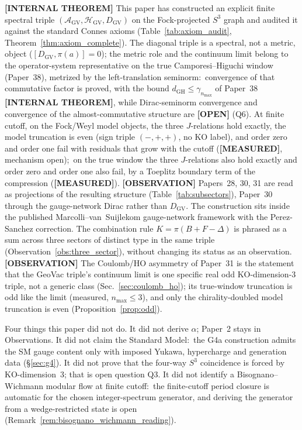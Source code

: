 \documentclass[11pt]{article}
\newcommand{\gvc}[2]{#2}
\begin{document}
\textbf{[INTERNAL THEOREM]} This paper has constructed an explicit finite spectral triple
$(\mathcal{A}_{\mathrm{GV}}, \mathcal{H}_{\mathrm{GV}},
D_{\mathrm{GV}})$ on the Fock-projected $S^3$ graph and audited it
against the standard Connes axioms (Table~\ref{tab:axiom_audit},
Theorem~\ref{thm:axiom_complete}).  The diagonal triple is a spectral,
not a metric, object ($[D_{\mathrm{GV}}, \pi(a)] = 0$); the metric
role and the continuum limit belong to the operator-system
representative on the true Camporesi--Higuchi window (Paper~38),
metrized by the left-translation seminorm:\ convergence of that
commutative factor is proved, with the bound $d_{\mathrm{GH}} \le
\gamma_{n_{\max}}$ of Paper~38 \textbf{[INTERNAL THEOREM]}, while Dirac-seminorm
convergence and convergence of the almost-commutative structure are
\textbf{[OPEN]} (Q6).  At finite cutoff, on the Fock/Weyl model objects,
the three $J$-relations hold exactly, the model truncation is even
(sign triple $(-, +, +)$, no KO label), and order zero and order one
fail with residuals that grow with the cutoff (\textbf{[MEASURED]},
mechanism open);\ on the true window the three $J$-relations also hold
exactly and order zero and order one also fail, by a Toeplitz boundary
term of the compression (\textbf{[MEASURED]}).
\textbf{[OBSERVATION]} Papers~28, 30, 31 are read as projections of
the resulting structure (Table~\ref{tab:subsectors}), Paper~30
through the gauge-network Dirac rather than $D_{\mathrm{GV}}$.  The construction sits inside the
published Marcolli--van~Suijlekom gauge-network framework with the
Perez-Sanchez correction.  \gvc{k-combination-rule}{The combination rule
$K = \pi(B + F - \Delta)$ is phrased as a sum across three
sectors of distinct type in the same triple
(Observation~\ref{obs:three_sector}), without changing its status as
an observation}.  \textbf{[OBSERVATION]} The Coulomb/HO asymmetry of Paper~31 is the
statement that the GeoVac triple's continuum limit is one specific real
odd $\mathrm{KO}$-dimension-3 triple, not a generic class
(Sec.~\ref{sec:coulomb_ho}); its true-window truncation is odd
like the limit (measured, $n_{\max} \le 3$), and only the chirality-doubled model truncation is even
(Proposition~\ref{prop:odd}).

Four things this paper did not do.  It did not derive $\alpha$;
Paper~2 stays in Observations.  It did not claim the Standard Model:\
the G4a construction admits the SM gauge content only with imposed
Yukawa, hypercharge and generation data (\S\ref{sec:g4}).  It did not prove that the
four-way $S^3$ coincidence is forced by $\mathrm{KO}$-dimension~3;
that is open question Q3.  It did not identify a Bisognano--Wichmann
modular flow at finite cutoff:\ the finite-cutoff period closure is
automatic for the chosen integer-spectrum generator, and deriving the
generator from a wedge-restricted state is open
(Remark~\ref{rem:bisognano_wichmann_reading}).
\end{document}
